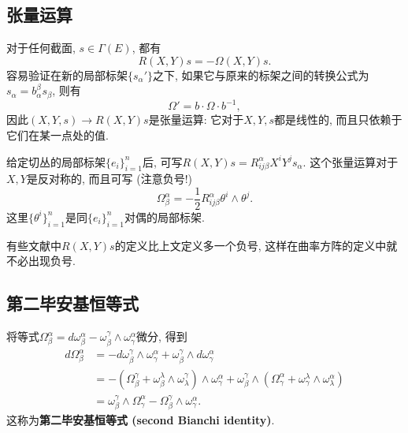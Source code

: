 \subsection{张量运算}
对于任何截面, $s\in\Gamma(E)$, 都有
$$
R(X,Y)s=-\Omega(X,Y)s.
$$
容易验证在新的局部标架$\{s_\alpha'\}$之下, 如果它与原来的标架之间的转换公式为$s_\alpha=b_\alpha^\beta s_\beta$, 则有
$$
\Omega'=b\cdot\Omega \cdot b^{-1},
$$
因此$(X,Y,s)\to R(X,Y)s$是张量运算: 它对于$X,Y,s$都是线性的, 而且只依赖于它们在某一点处的值. 

给定切丛的局部标架$\{e_i\}_{i=1}^n$后, 可写$R(X,Y)s=R^\alpha_{ij\beta}X^iY^js_\alpha$. 这个张量运算对于$X,Y$是反对称的, 而且可写 (注意负号!)
$$
\Omega_\beta^\alpha=-\frac{1}{2}R^\alpha_{ij\beta}\theta^i\wedge\theta^j.
$$
这里$\{\theta^i\}_{i=1}^n$是同$\{e_i\}_{i=1}^n$对偶的局部标架.

有些文献中$R(X,Y)s$的定义比上文定义多一个负号, 这样在曲率方阵的定义中就不必出现负号.

\subsection{第二毕安基恒等式}
将等式$\Omega_\beta^\alpha=d\omega_\beta^\alpha-\omega_\beta^\gamma\wedge\omega_\gamma^\alpha$微分, 得到
$$
\begin{aligned}
d\Omega_\beta^\alpha&=-d\omega_\beta^\gamma\wedge\omega_\gamma^\alpha+\omega_\beta^\gamma\wedge d\omega_\gamma^\alpha\\
&=-(\Omega_\beta^\gamma+\omega_\beta^\lambda\wedge\omega_\lambda^\gamma)\wedge\omega_\gamma^\alpha
+\omega_\beta^\gamma\wedge(\Omega_\gamma^\alpha+\omega_\gamma^\lambda\wedge\omega_\lambda^\alpha)\\
&=\omega_\beta^\gamma\wedge\Omega_\gamma^\alpha-\Omega_\beta^\gamma\wedge\omega_\gamma^\alpha.
\end{aligned}
$$
这称为\textbf{第二毕安基恒等式 (second Bianchi identity)}.